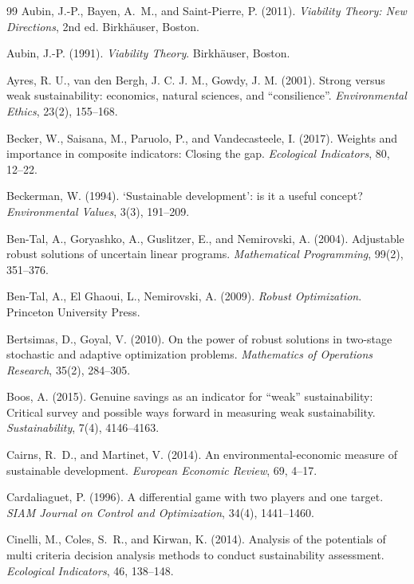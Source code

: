 \documentclass[preprint,11pt,authoryear]{elsarticle}
\theoremstyle{definition}
\theoremstyle{remark}
\begin{document}
\begin{thebibliography}{99}
 Aubin, J.-P., Bayen, A.~M., and Saint-Pierre, P. (2011). \emph{Viability Theory: New Directions}, 2nd ed. Birkh\"auser, Boston.

 Aubin, J.-P. (1991). \emph{Viability Theory}. Birkh\"auser, Boston.

 Ayres, R. U., van den Bergh, J. C. J. M., Gowdy, J. M. (2001). Strong versus weak sustainability: economics, natural sciences, and ``consilience''. \emph{Environmental Ethics}, 23(2), 155--168.

 Becker, W., Saisana, M., Paruolo, P., and Vandecasteele, I. (2017). Weights and importance in composite indicators: Closing the gap. \emph{Ecological Indicators}, 80, 12--22.

 Beckerman, W. (1994). `Sustainable development': is it a useful concept? \emph{Environmental Values}, 3(3), 191--209.

 Ben-Tal, A., Goryashko, A., Guslitzer, E., and Nemirovski, A. (2004). Adjustable robust solutions of uncertain linear programs. \emph{Mathematical Programming}, 99(2), 351--376.

 Ben-Tal, A., El Ghaoui, L., Nemirovski, A. (2009). \emph{Robust Optimization}. Princeton University Press.

 Bertsimas, D., Goyal, V. (2010). On the power of robust solutions in two-stage stochastic and adaptive optimization problems. \emph{Mathematics of Operations Research}, 35(2), 284--305.

 Boos, A. (2015). Genuine savings as an indicator for ``weak'' sustainability: Critical survey and possible ways forward in measuring weak sustainability. \emph{Sustainability}, 7(4), 4146--4163.

 Cairns, R.~D., and Martinet, V. (2014). An environmental-economic measure of sustainable development. \emph{European Economic Review}, 69, 4--17.

 Cardaliaguet, P. (1996). A differential game with two players and one target. \emph{SIAM Journal on Control and Optimization}, 34(4), 1441--1460.

 Cinelli, M., Coles, S.~R., and Kirwan, K. (2014). Analysis of the potentials of multi criteria decision analysis methods to conduct sustainability assessment. \emph{Ecological Indicators}, 46, 138--148.


\end{thebibliography}
\end{document}
